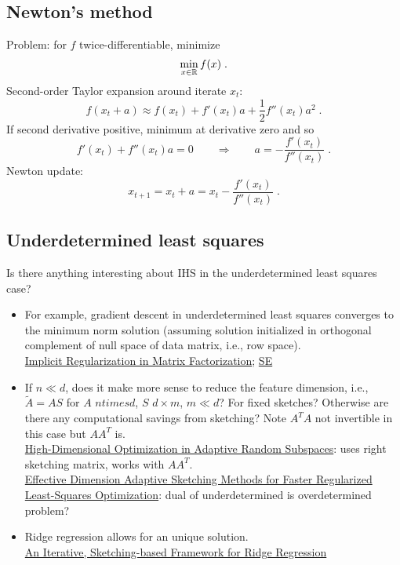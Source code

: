 \documentclass[10pt]{article}
\begin{document}
\subsection{Newton's method}

Problem: for $f$ twice-differentiable, minimize
\[
\min_{x\in\mathbb{R}} f(x) \;.
\]
Second-order Taylor expansion around iterate $x_t$:
\[
f(x_t+a) \approx f(x_t) + f'(x_t)a + \frac{1}{2}f''(x_t)a^2 \;.
\]
If second derivative positive, minimum at derivative zero and so
\[
f'(x_t) + f''(x_t)a = 0 \qquad \Rightarrow\qquad a = -\frac{f'(x_t)}{f''(x_t)} \;.
\]
Newton update:
\[
x_{t+1} = x_t +a = x_t - \frac{f'(x_t)}{f''(x_t)} \;.
\]


\subsection{Underdetermined least squares}

Is there anything interesting about IHS in the underdetermined least squares case?
\begin{itemize}

\item
For example, gradient descent in underdetermined least squares converges to the minimum norm solution (assuming solution initialized in orthogonal complement of null space of data matrix, i.e., row space). \\
\href{https://arxiv.org/pdf/1705.09280.pdf}{Implicit Regularization in Matrix Factorization}; \href{https://math.stackexchange.com/questions/3451272/does-gradient-descent-converge-to-a-minimum-norm-solution-in-least-squares-probl}{SE}

\item
If $n\ll d$, does it make more sense to reduce the feature dimension, i.e., $\tilde{A}=AS$ for $A$ $n times d$, $S$ $d\times m$, $m\ll d$? For fixed sketches? Otherwise are there any computational savings from sketching? Note $A^TA$ not invertible in this case but $AA^T$ is. \\
\href{https://proceedings.neurips.cc/paper/2019/file/51425b752a0b402ed3effc83fc4bbb74-Paper.pdf}{High-Dimensional Optimization in Adaptive Random Subspaces}: uses right sketching matrix, works with $AA^T$. \\
\href{https://arxiv.org/pdf/2006.05874.pdf}{Effective Dimension Adaptive Sketching Methods for Faster Regularized Least-Squares Optimization}: dual of underdetermined is overdetermined problem?

\item
Ridge regression allows for an unique solution. \\
\href{https://proceedings.mlr.press/v80/chowdhury18a/chowdhury18a.pdf}{An Iterative, Sketching-based Framework for Ridge Regression}

\end{itemize}
\end{document}

